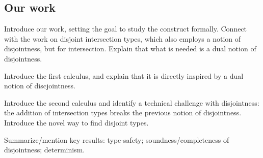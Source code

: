 \subsection{Our work}


Introduce our work, setting the goal to study the construct formally.
Connect with the work on disjoint intersection types, which also
employs a notion of disjointness, but for intersection. Explain that
what is needed is a dual notion of disjointness.

Introduce the first calculus, and explain that it is directly inspired
by a dual notion of discjointness.

Introduce the second calculus and identify a technical challenge with
disjointness: the addition of intersection types breaks the previous
notion of disjointness. Introduce the novel way to find disjoint types.

Summarize/mention key results: type-safety; soundness/completeness of
disjointness; determinism.

